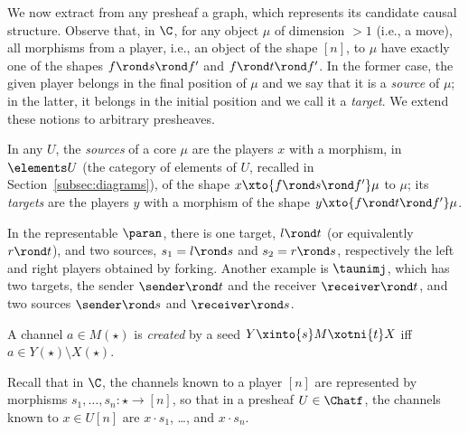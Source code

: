 \documentclass{LMCS}
\theoremstyle{plain}\newtheorem{satz}[thm]{Satz}
\begin{document}
We now extract from any presheaf a graph, which represents its
candidate causal structure.  Observe that, in $\C$, for any object
$\mu$ of dimension $>1$ (i.e., a move), all morphisms from a player,
i.e., an object of the shape $[n]$, to $\mu$ have exactly one of the
shapes $f \rond s \rond f'$ and $f \rond t \rond f'$. In the former
case, the given player belongs in the final position of $\mu$ and we
say that it is a \emph{source} of $\mu$; in the latter, it belongs in
the initial position and we call it a \emph{target}. We extend these
notions to arbitrary presheaves.
 \begin{defi}
   In any $U$, the \emph{sources} of a core $\mu$ are the players $x$
   with a morphism, in $\elements U$ (the category of elements of $U$,
   recalled in Section~\ref{subsec:diagrams}), of the shape $x \xto{f
     \rond s \rond f'} \mu$ to $\mu$; its \emph{targets} are the
   players $y$ with a morphism of the shape $y \xto{f \rond t \rond
     f'} \mu$.
 \end{defi}
 \begin{exa}
   In the representable $\paran$, there is one target, $l \rond t$ (or
   equivalently $r \rond t$), and two sources, $s_1 = l \rond s$ and
   $s_2 = r \rond s$, respectively the left and right players obtained
   by forking.  Another example is $\taunimj$, which has two targets,
   the sender $\sender \rond t$ and the receiver $\receiver \rond t$,
   and two sources $\sender \rond s$ and $\receiver \rond s$.
 \end{exa}
 \begin{defi}
   A channel $a \in M (\star)$ is \emph{created} by a seed $Y
   \xinto{s} M \xotni{t} X$ iff $a \in Y (\star) \setminus X (\star)$.
 \end{defi}
 Recall that in $\C$, the channels known to a player $[n]$ are
 represented by morphisms $s_1, \ldots, s_n \colon \star \to [n]$, so
 that in a presheaf $U \in \Chatf$, the channels known to $x \in U[n]$
 are $x \cdot s_1$, \ldots, and $x \cdot s_n$.
\end{document}
